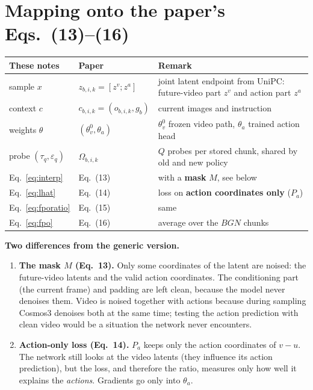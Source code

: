 \documentclass[11pt,a4paper]{article}
\begin{document}
\section{Mapping onto the paper's Eqs.~(13)--(16)}\label{sec:paper}
\begin{center}
\small
\begin{tabularx}{\linewidth}{@{}l l Y@{}}
\toprule
These notes & Paper & Remark\\
\midrule
sample $x$ & $z_{b,i,k}=[z^v;z^a]$ & joint latent endpoint from UniPC: future-video part $z^v$ and action part $z^a$\\
context $c$ & $c_{b,i,k}=(o_{b,i,k},g_b)$ & current images and instruction\\
weights $\theta$ & $(\theta_v^0,\theta_a)$ & $\theta_v^0$ frozen video path, $\theta_a$ trained action head\\
probe $(\tau_q,\varepsilon_q)$ & $\Omega_{b,i,k}$ & $Q$ probes per stored chunk, shared by old and new policy\\
Eq.~\eqref{eq:interp} & Eq.~(13) & with a \textbf{mask} $M$, see below\\
Eq.~\eqref{eq:lhat} & Eq.~(14) & loss on \textbf{action coordinates only} ($P_a$)\\
Eq.~\eqref{eq:fporatio} & Eq.~(15) & same\\
Eq.~\eqref{eq:fpo} & Eq.~(16) & average over the $BGN$ chunks\\
\bottomrule
\end{tabularx}
\end{center}

\textbf{Two differences from the generic version.}
\begin{enumerate}
\item \textbf{The mask $M$ (Eq.~13).} Only some coordinates of the latent are noised: the future-video latents and the valid action coordinates. The conditioning part (the current frame) and padding are left clean, because the model never denoises them. Video is noised together with actions because during sampling Cosmos3 denoises both at the same time; testing the action prediction with clean video would be a situation the network never encounters.
\item \textbf{Action-only loss (Eq.~14).} $P_a$ keeps only the action coordinates of $v-u$. The network still looks at the video latents (they influence its action prediction), but the loss, and therefore the ratio, measures only how well it explains the \emph{actions}. Gradients go only into $\theta_a$.
\end{enumerate}
\end{document}
